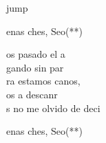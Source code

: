 \begin{cancion}jump\\
	\begin{chorus}%
		enas ches, Seo(**)\jump\\
	\end{chorus}%
	os pasado el a \\
	gando sin par\\
	ra estamos canos,\\
	os a descanr\\
	s no me olvido de deci\jump\\
	\begin{chorus}%
		enas ches, Seo(**)\jump\\
	\end{chorus}%
\end{cancion}%
